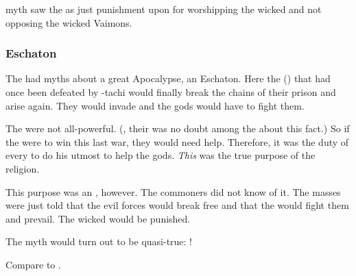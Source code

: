 \Ortaican myth saw the \HundredScourges as just punishment upon \Miithians for worshipping the wicked \Archons and not opposing the wicked Vaimons.





\subsubsection{Eschaton}
The \Ortaicans had myths about a great Apocalypse, an Eschaton. 
Here the  (\banes) that had once been defeated by \Sethicus-tachi would finally break the chains of their prison and arise again.
They would invade \Miith and the gods would have to fight them. 

The \taorthae were not all-powerful. 
(, their was no doubt among the \rethyaxes about this fact.)
So if the \taorthae were to win this last war, they would need help.
Therefore, it was the duty of every \rethyax to do his utmost to help the gods. 
\emph{This} was the true purpose of the \Ortaican religion. 

This purpose was an \arcanum, however. 
The commoners did not know of it.
The masses were just told that the evil forces would break free and that the \taorthae would fight them and prevail.
The wicked would be punished. 

The \Ortaican myth would turn out to be quasi-true:
!

Compare to . 

